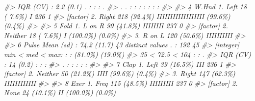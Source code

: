 \documentclass[
]{book}
\newenvironment{Shaded}{\begin{snugshade}}{\end{snugshade}}
\newcommand{\CommentTok}[1]{\textcolor[rgb]{0.56,0.35,0.01}{\textit{#1}}}
\begin{document}
\begin{Shaded}
\begin{Highlighting}[]
\CommentTok{\#\textgreater{}                          IQR (CV) : 2.2 (0.1)                                 . : : : .                           }
\CommentTok{\#\textgreater{}                                                                         .   . : : : : : : :                       }
\CommentTok{\#\textgreater{} }
\CommentTok{\#\textgreater{} 4    W.Hnd               1. Left                    18 ( 7.6\%)          I                     236        1        }
\CommentTok{\#\textgreater{}      [factor]            2. Right                  218 (92.4\%)          IIIIIIIIIIIIIIIIII    (99.6\%)    (0.4\%)   }
\CommentTok{\#\textgreater{} }
\CommentTok{\#\textgreater{} 5    Fold                1. L on R                  99 (41.8\%)          IIIIIIII              237        0        }
\CommentTok{\#\textgreater{}      [factor]            2. Neither                 18 ( 7.6\%)          I                     (100.0\%)   (0.0\%)   }
\CommentTok{\#\textgreater{}                          3. R on L                 120 (50.6\%)          IIIIIIIIII                                }
\CommentTok{\#\textgreater{} }
\CommentTok{\#\textgreater{} 6    Pulse               Mean (sd) : 74.2 (11.7)   43 distinct values         . :             192        45       }
\CommentTok{\#\textgreater{}      [integer]           min \textless{} med \textless{} max:                                     : :             (81.0\%)    (19.0\%)  }
\CommentTok{\#\textgreater{}                          35 \textless{} 72.5 \textless{} 104                                      : : .                               }
\CommentTok{\#\textgreater{}                          IQR (CV) : 14 (0.2)                                  : : :                               }
\CommentTok{\#\textgreater{}                                                                           . : : : : :                             }
\CommentTok{\#\textgreater{} }
\CommentTok{\#\textgreater{} 7    Clap                1. Left                    39 (16.5\%)          III                   236        1        }
\CommentTok{\#\textgreater{}      [factor]            2. Neither                 50 (21.2\%)          IIII                  (99.6\%)    (0.4\%)   }
\CommentTok{\#\textgreater{}                          3. Right                  147 (62.3\%)          IIIIIIIIIIII                              }
\CommentTok{\#\textgreater{} }
\CommentTok{\#\textgreater{} 8    Exer                1. Freq                   115 (48.5\%)          IIIIIIIII             237        0        }
\CommentTok{\#\textgreater{}      [factor]            2. None                    24 (10.1\%)          II                    (100.0\%)   (0.0\%)   }

\end{Highlighting}
\end{Shaded}
\end{document}
